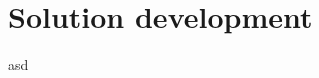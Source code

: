 \graphicspath{{solutiondevelopment/fig/}}

\chapter{Solution development}
\label{chap:solutiondevelopment}

asd